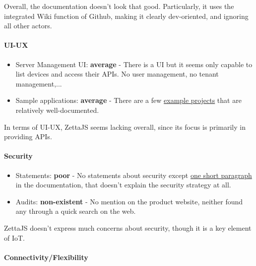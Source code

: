\documentclass{article}
\begin{document}
Overall, the documentation doesn't look that good. Particularly, it uses the integrated Wiki function of Github, making it clearly dev-oriented, and ignoring all other actors.

\paragraph{UI-UX}

\begin{itemize}
\item Server Management UI: \textbf{average} - There is a UI but it seems only capable to list devices and access their APIs. No user management, no tenant management,...
\item Sample applications: \textbf{average} - There are a few \href{http://www.zettajs.org/projects/}{example projects} that are relatively well-documented.
\end{itemize}

In terms of UI-UX, ZettaJS seems lacking overall, since its focus is primarily in providing APIs.

\paragraph{Security}

\begin{itemize}
\item Statements: \textbf{poor} - No statements about security except \href{https://github.com/zettajs/zetta/wiki/Overview#linking}{one short paragraph} in the documentation, that doesn't explain the security strategy at all.
\item Audits: \textbf{non-existent} - No mention on the product website, neither found any through a quick search on the web.
\end{itemize}

ZettaJS doesn't express much concerns about security, though it is a key element of IoT.

\paragraph{Connectivity/Flexibility}
\end{document}
